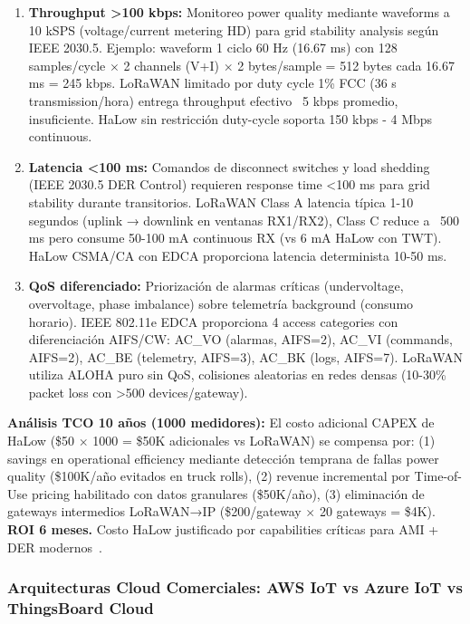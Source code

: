 \begin{enumerate}
    \item \textbf{Throughput >100 kbps:} Monitoreo power quality mediante waveforms a 10 kSPS (voltage/current metering HD) para grid stability analysis según IEEE 2030.5. Ejemplo: waveform 1 ciclo 60 Hz (16.67 ms) con 128 samples/cycle $\times$ 2 channels (V+I) $\times$ 2 bytes/sample = 512 bytes cada 16.67 ms = 245 kbps. LoRaWAN limitado por duty cycle 1\% FCC (36 s transmission/hora) entrega throughput efectivo ~5 kbps promedio, insuficiente. HaLow sin restricción duty-cycle soporta 150 kbps - 4 Mbps continuous.
    
    \item \textbf{Latencia <100 ms:} Comandos de disconnect switches y load shedding (IEEE 2030.5 DER Control) requieren response time <100 ms para grid stability durante transitorios. LoRaWAN Class A latencia típica 1-10 segundos (uplink → downlink en ventanas RX1/RX2), Class C reduce a ~500 ms pero consume 50-100 mA continuous RX (vs 6 mA HaLow con TWT). HaLow CSMA/CA con EDCA proporciona latencia determinista 10-50 ms.
    
    \item \textbf{QoS diferenciado:} Priorización de alarmas críticas (undervoltage, overvoltage, phase imbalance) sobre telemetría background (consumo horario). IEEE 802.11e EDCA proporciona 4 access categories con diferenciación AIFS/CW: AC\_VO (alarmas, AIFS=2), AC\_VI (commands, AIFS=2), AC\_BE (telemetry, AIFS=3), AC\_BK (logs, AIFS=7). LoRaWAN utiliza ALOHA puro sin QoS, colisiones aleatorias en redes densas (10-30\% packet loss con >500 devices/gateway).
\end{enumerate}

\textbf{Análisis TCO 10 años (1000 medidores):} El costo adicional CAPEX de HaLow (\$50 $\times$ 1000 = \$50K adicionales vs LoRaWAN) se compensa por: (1) savings en operational efficiency mediante detección temprana de fallas power quality (\$100K/año evitados en truck rolls), (2) revenue incremental por Time-of-Use pricing habilitado con datos granulares (\$50K/año), (3) eliminación de gateways intermedios LoRaWAN→IP (\$200/gateway $\times$ 20 gateways = \$4K). \textbf{ROI 6 meses.} Costo HaLow justificado por capabilities críticas para AMI + DER modernos~\cite{scharerPushingWiFiHaLow2025}.

\subsubsection{Arquitecturas Cloud Comerciales: AWS IoT vs Azure IoT vs ThingsBoard Cloud}

